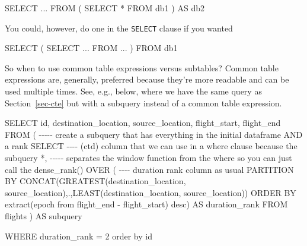 \documentclass[
  letterpaper,
  DIV=11,
  numbers=noendperiod]{scrreprt}
\newenvironment{Shaded}{\begin{snugshade}}{\end{snugshade}}
\newcommand{\CommentTok}[1]{\textcolor[rgb]{0.37,0.37,0.37}{#1}}
\newcommand{\DecValTok}[1]{\textcolor[rgb]{0.68,0.00,0.00}{#1}}
\newcommand{\FunctionTok}[1]{\textcolor[rgb]{0.28,0.35,0.67}{#1}}
\newcommand{\KeywordTok}[1]{\textcolor[rgb]{0.00,0.23,0.31}{#1}}
\newcommand{\NormalTok}[1]{\textcolor[rgb]{0.00,0.23,0.31}{#1}}
\newcommand{\OperatorTok}[1]{\textcolor[rgb]{0.37,0.37,0.37}{#1}}
\newcommand{\StringTok}[1]{\textcolor[rgb]{0.13,0.47,0.30}{#1}}
\begin{document}
\begin{Shaded}
\begin{Highlighting}[]
\KeywordTok{SELECT} \OperatorTok{..}\NormalTok{.}
\KeywordTok{FROM}\NormalTok{ (}
  \KeywordTok{SELECT} \OperatorTok{*}
  \KeywordTok{FROM}\NormalTok{ db1}
\NormalTok{) }\KeywordTok{AS}\NormalTok{ db2}
\end{Highlighting}
\end{Shaded}

You could, however, do one in the \texttt{SELECT} clause if you wanted

\begin{Shaded}
\begin{Highlighting}[]
\KeywordTok{SELECT}\NormalTok{ (}
  \KeywordTok{SELECT} \OperatorTok{..}\NormalTok{.}
  \KeywordTok{FROM} \OperatorTok{..}\NormalTok{.}
\NormalTok{)}
\KeywordTok{FROM}\NormalTok{ db1}
\end{Highlighting}
\end{Shaded}

So when to use common table expressions versus subtables? Common table
expressions are, generally, preferred because they're more readable and
can be used multiple times. See, e.g., below, where we have the same
query as Section~\ref{sec-cte} but with a subquery instead of a common
table expression.

\begin{Shaded}
\begin{Highlighting}[]
\KeywordTok{SELECT} 
\KeywordTok{id}\NormalTok{, }
\NormalTok{destination\_location,}
\NormalTok{source\_location,}
\NormalTok{flight\_start,}
\NormalTok{flight\_end}
\KeywordTok{FROM}\NormalTok{ ( }\CommentTok{{-}{-}{-}{-}{-} create a subquery that has everything in the initial dataframe AND a rank}
    \KeywordTok{SELECT}  \CommentTok{{-}{-}{-}{-} (ctd) column that we can use in a where clause because the subquery }
    \OperatorTok{*}\NormalTok{,   }\CommentTok{{-}{-}{-}{-}{-} separates the window function from the where so you can just call the }
\FunctionTok{dense\_rank}\NormalTok{() }\KeywordTok{OVER}\NormalTok{ ( }\CommentTok{{-}{-}{-}{-} duration rank column as usual}
    \KeywordTok{PARTITION} \KeywordTok{BY} \FunctionTok{CONCAT}\NormalTok{(}\FunctionTok{GREATEST}\NormalTok{(destination\_location, source\_location),}\StringTok{\textquotesingle{}.\textquotesingle{}}\NormalTok{,}\FunctionTok{LEAST}\NormalTok{(destination\_location, source\_location))}
    \KeywordTok{ORDER} \KeywordTok{BY} \FunctionTok{extract}\NormalTok{(epoch }\KeywordTok{from}\NormalTok{ flight\_end }\OperatorTok{{-}}\NormalTok{ flight\_start) }\KeywordTok{desc}\NormalTok{) }\KeywordTok{AS}\NormalTok{ duration\_rank}
    \KeywordTok{FROM}\NormalTok{ flights}
\NormalTok{    ) }\KeywordTok{AS}\NormalTok{ subquery}

\KeywordTok{WHERE}\NormalTok{ duration\_rank }\OperatorTok{=} \DecValTok{2}
\KeywordTok{order} \KeywordTok{by} \KeywordTok{id}
\end{Highlighting}
\end{Shaded}
\end{document}

